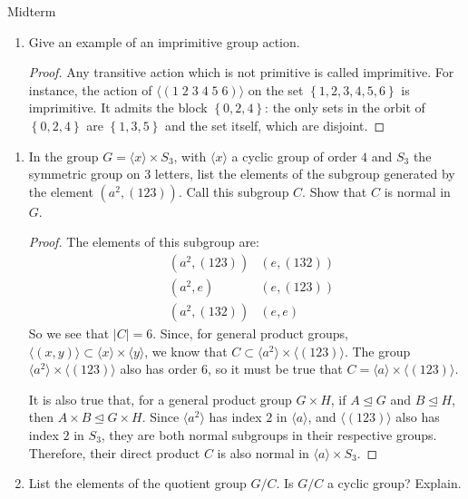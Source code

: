 \documentclass[12pt]{article}
\theoremstyle{definition}
\newenvironment{problem}[2][Problem]{\begin{trivlist}
\item[\hskip \labelsep {\bfseries #1}\hskip \labelsep {\bfseries #2.}]}{\end{trivlist}}
\begin{document}
\begin{section}{Midterm}
\begin{problem}{2}
\begin{enumerate}[label=(\alph*)]
\begin{proof}
			\end{proof}
		\item Give an example of an imprimitive group action.
			\begin{proof}
				Any transitive action which is not primitive is called imprimitive. For instance, the action of $\langle (1 \; 2 \; 3 \; 4 \; 5 \; 6)\rangle $ on the set $\left\{ 1, 2, 3, 4, 5, 6 \right\}$ is imprimitive. It admits the block $\left\{ 0, 2, 4 \right\}$: the only sets in the orbit of $\left\{ 0, 2, 4 \right\}$ are $\left\{ 1, 3, 5 \right\}$ and the set itself, which are disjoint.
			\end{proof}
	\end{enumerate}
\end{problem}
\begin{problem}{3}
	\begin{enumerate}[label=(\alph*)]
		\item In the group $G = \langle x\rangle \times S_3$, with $\langle x\rangle$ a cyclic group of order $4$  and $S_3$ the symmetric group on $3$ letters, list the elements of the subgroup generated by the element $(a^2, (123))$. Call this subgroup $C$. Show that $C$ is normal in $G$.
			\begin{proof}
				The elements of this subgroup are:
				\begin{align*}
					&(a^2, (123)) &(e, (132))\\
					&(a^2, e) &(e, (123))\\
					&(a^2, (132)) & (e,e )
				\end{align*}
				So we see that $\left \lvert { C } \right \lvert  = 6$. Since, for general product groups,  $\langle (x, y)\rangle \subset \langle x\rangle \times \langle y\rangle$,  we know that $C \subset \langle a^2\rangle \times \langle (123)\rangle$. The group $\langle a^2\rangle \times \langle (123)\rangle $ also has order $6$, so it must be true that $C = \langle a\rangle \times \langle (123)\rangle$.
				\par It is also true that, for a general product group $G \times H$, if $A \trianglelefteq G$ and $B \trianglelefteq H$, then $A \times B \trianglelefteq G \times H$. Since $\langle a^2\rangle$ has index $2$ in $\langle a\rangle$, and $\langle (123)\rangle$ also has index $2$ in $S_3$, they are both normal subgroups in their respective groups. Therefore, their direct product $C$ is also normal in $\langle a\rangle \times S_3$.
			\end{proof}
		\item List the elements of the quotient group $G/ C$. Is $G/C$ a cyclic group? Explain.

\end{enumerate}
\end{problem}
\end{section}
\end{document}
